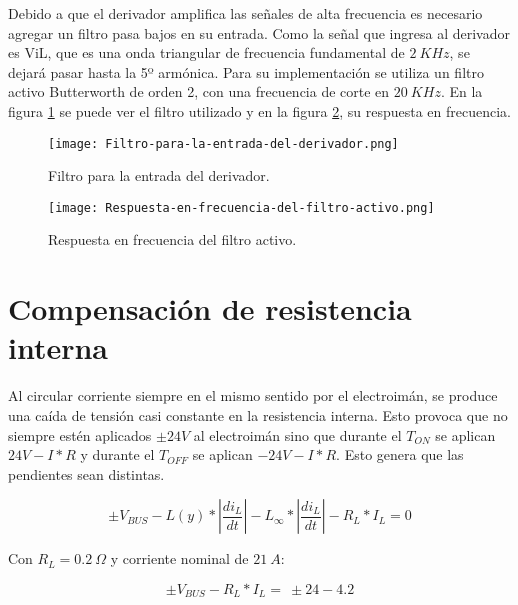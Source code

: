 \noindent Debido a que el derivador amplifica las se\~{n}ales de alta frecuencia es necesario agregar un filtro pasa bajos en su entrada. Como la se\~{n}al que ingresa al derivador es ViL, que es una onda triangular de frecuencia fundamental de $2\:KHz$, se dejar\'{a} pasar hasta la 5º arm\'{o}nica. Para su implementaci\'{o}n se utiliza un filtro activo Butterworth de orden 2, con una frecuencia de corte en $20\:KHz$. En la figura  \ref{fig:img_Filtro-para-la-entrada-del-derivador} se puede ver el filtro utilizado y en la figura \ref{fig:img_Respuesta-en-frecuencia-del-filtro-activo}, su respuesta en frecuencia.

\begin{figure}[H]
	\centering
	\texttt{[image: Filtro-para-la-entrada-del-derivador.png]}
	\caption{Filtro para la entrada del derivador.}
	\label{fig:img_Filtro-para-la-entrada-del-derivador}
\end{figure}

\begin{figure}[H]
	\centering
	\texttt{[image: Respuesta-en-frecuencia-del-filtro-activo.png]}
	\caption{Respuesta en frecuencia del filtro activo.}
	\label{fig:img_Respuesta-en-frecuencia-del-filtro-activo}
\end{figure}

\section{Compensaci\'{o}n de resistencia interna}

\noindent Al circular corriente siempre en el mismo sentido por el electroim\'{a}n, se produce una ca\'{i}da de tensi\'{o}n casi constante en la resistencia interna. Esto provoca que no siempre est\'{e}n aplicados $\pm 24V$ al electroim\'{a}n sino que durante el $T_{ON}$ se aplican $24V-I*R$ y durante el $T_{OFF}$ se aplican $-24V-I*R$. Esto genera que las pendientes sean distintas.

\begin{equation} \label{eq_Vbus-didt-RL}
\pm V_{BUS}-L(y)*\left|\frac{{di}_L}{dt}\right|-L_{\infty }*\left|\frac{{di}_L}{dt}\right|-R_L*I_L=0
\end{equation}

\noindent Con  $R_L=0.2\ \mathit{\Omega}$ y corriente nominal  de $21\ A$:

\begin{equation} \label{eq_Vbus-didt-RL-2}
\pm V_{BUS}-R_L*I_L=\ \pm 24-4.2
\end{equation}

